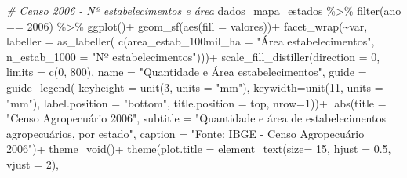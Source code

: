 \documentclass[
  brazilian,
]{book}
\newenvironment{Shaded}{\begin{snugshade}}{\end{snugshade}}
\newcommand{\AttributeTok}[1]{\textcolor[rgb]{0.77,0.63,0.00}{#1}}
\newcommand{\CommentTok}[1]{\textcolor[rgb]{0.56,0.35,0.01}{\textit{#1}}}
\newcommand{\DecValTok}[1]{\textcolor[rgb]{0.00,0.00,0.81}{#1}}
\newcommand{\FloatTok}[1]{\textcolor[rgb]{0.00,0.00,0.81}{#1}}
\newcommand{\FunctionTok}[1]{\textcolor[rgb]{0.00,0.00,0.00}{#1}}
\newcommand{\NormalTok}[1]{#1}
\newcommand{\SpecialCharTok}[1]{\textcolor[rgb]{0.00,0.00,0.00}{#1}}
\newcommand{\StringTok}[1]{\textcolor[rgb]{0.31,0.60,0.02}{#1}}
\begin{document}
\begin{Shaded}
\begin{Highlighting}[]
\CommentTok{\# Censo 2006 {-} Nº estabelecimentos e área}
\NormalTok{dados\_mapa\_estados }\SpecialCharTok{\%\textgreater{}\%} 
  \FunctionTok{filter}\NormalTok{(ano }\SpecialCharTok{==} \DecValTok{2006}\NormalTok{) }\SpecialCharTok{\%\textgreater{}\%} 
  \FunctionTok{ggplot}\NormalTok{()}\SpecialCharTok{+}
  \FunctionTok{geom\_sf}\NormalTok{(}\FunctionTok{aes}\NormalTok{(}\AttributeTok{fill =}\NormalTok{ valores))}\SpecialCharTok{+}
  \FunctionTok{facet\_wrap}\NormalTok{(}\SpecialCharTok{\textasciitilde{}}\NormalTok{var,}
             \AttributeTok{labeller =} \FunctionTok{as\_labeller}\NormalTok{(}
               \FunctionTok{c}\NormalTok{(}\AttributeTok{area\_estab\_100mil\_ha =} \StringTok{"Área estabelecimentos"}\NormalTok{,}
                 \AttributeTok{n\_estab\_1000 =} \StringTok{"Nº estabelecimentos"}\NormalTok{)))}\SpecialCharTok{+}
  \FunctionTok{scale\_fill\_distiller}\NormalTok{(}\AttributeTok{direction =} \DecValTok{0}\NormalTok{,}
                       \AttributeTok{limits =} \FunctionTok{c}\NormalTok{(}\DecValTok{0}\NormalTok{, }\DecValTok{800}\NormalTok{),}
                       \AttributeTok{name =} \StringTok{"Quantidade e Área estabelecimentos"}\NormalTok{,}
                       \AttributeTok{guide =} \FunctionTok{guide\_legend}\NormalTok{(}
                         \AttributeTok{keyheight =} \FunctionTok{unit}\NormalTok{(}\DecValTok{3}\NormalTok{, }\AttributeTok{units =} \StringTok{"mm"}\NormalTok{),}
                         \AttributeTok{keywidth=}\FunctionTok{unit}\NormalTok{(}\DecValTok{11}\NormalTok{, }\AttributeTok{units =} \StringTok{"mm"}\NormalTok{),}
                         \AttributeTok{label.position =} \StringTok{"bottom"}\NormalTok{,}
                         \AttributeTok{title.position =} \StringTok{\textquotesingle{}top\textquotesingle{}}\NormalTok{, }\AttributeTok{nrow=}\DecValTok{1}\NormalTok{))}\SpecialCharTok{+}
  \FunctionTok{labs}\NormalTok{(}\AttributeTok{title =} \StringTok{"Censo Agropecuário 2006"}\NormalTok{,}
       \AttributeTok{subtitle =} \StringTok{"Quantidade e área de estabelecimentos agropecuários, por estado"}\NormalTok{,}
       \AttributeTok{caption =} \StringTok{"Fonte: IBGE {-} Censo Agropecuário 2006"}\NormalTok{)}\SpecialCharTok{+}
  \FunctionTok{theme\_void}\NormalTok{()}\SpecialCharTok{+}
  \FunctionTok{theme}\NormalTok{(}\AttributeTok{plot.title =} \FunctionTok{element\_text}\NormalTok{(}\AttributeTok{size=} \DecValTok{15}\NormalTok{, }\AttributeTok{hjust =} \FloatTok{0.5}\NormalTok{, }\AttributeTok{vjust =} \DecValTok{2}\NormalTok{),}

\end{Highlighting}
\end{Shaded}
\end{document}
